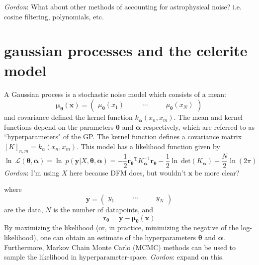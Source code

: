 \documentclass[modern]{aastex62}
\newcommand{\todo}[3]{{\color{#2}\emph{#1}: #3}}
\newcommand{\gordontodo}[1]{\todo{Gordon}{red}{#1}}
\newcommand{\bvec}[1]{{\ensuremath{\boldsymbol{#1}}}}
\newcommand{\T}{\ensuremath{\mathrm{T}}}
\newcommand{\expandvec}[2]{\left(\begin{array}{ccccc} #1\quad && \cdots\quad && #2 \end{array}\right)}
\begin{document}
	\gordontodo{What about other methods of accounting for astrophysical noise? i.e. cosine filtering, polynomials, etc.}
		
\section{gaussian processes and the celerite model}
	A Gaussian process is a stochastic noise model which consists of a mean:
	\begin{equation} 
		\bvec{\mu_\theta}(\bvec{x}) = \expandvec{\mu_\bvec{\theta}(x_1)}{\mu_\bvec{\theta}(x_N)}
	\end{equation}
	and covariance defined the kernel function $k_\bvec{\alpha}(x_n, x_m)$. The mean and kernel functions depend on the parameters 
	$\bvec{\theta}$ and $\bvec{\alpha}$ respectively, which are referred to as ``hyperparameters" of the GP. The kernel function defines a covariance matrix 
	$\left[K\right]_{n, m} = k_\alpha(x_n, x_m)$. This model has a likelihood function given by
	\begin{equation}
		\ln\ \mathcal{L(\bvec{\theta}, \bvec{\alpha})} = \ln\ p(\bvec{y}|X, \bvec{\theta}, \bvec{\alpha}) = 
			-\frac{1}{2}\bvec{r_\theta}^\T K_\bvec{\alpha}^{-1}\bvec{r_\theta} 
			-\frac{1}{2}\ln\ \mathrm{det}(K_\bvec{\alpha}) - \frac{N}{2}\ln(2\pi)
	\end{equation}
	\gordontodo{I'm using $X$ here because DFM does, but wouldn't $\bvec{x}$ be more clear?}
	
	where 
	\begin{equation}
		\bvec{y} = \expandvec{y_1}{y_N}
	\end{equation}
	are the data, $N$ is the number of datapoints, and
	\begin{equation}
		\bvec{r_\theta} = \bvec{y}-\bvec{\mu_\theta}(\bvec{x})
	\end{equation}
	By maximizing the likelihood (or, in practice, minimizing the negative of the log-likelihood), one can obtain an estimate of the hyperparameters $\bvec{\theta}$ and 
	$\bvec{\alpha}$. Furthermore, Markov Chain Monte Carlo (MCMC) methods can be used to sample the likelihood in hyperparameter-space. \gordontodo{expand 
	on this.}
\end{document}
